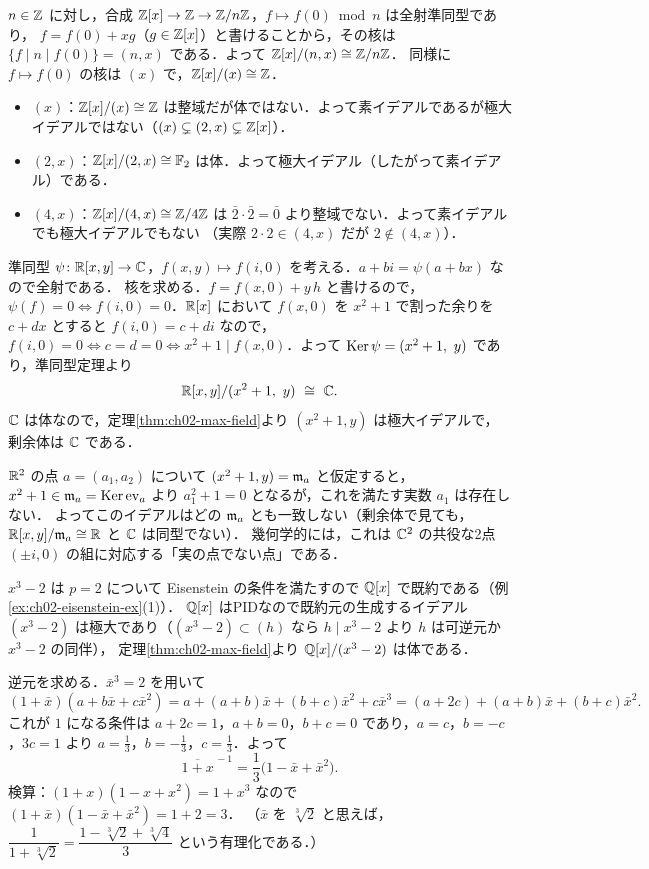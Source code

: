 $n\in\mathbb{Z}$ に対し，合成 $\mathbb{Z}[x]\to\mathbb{Z}\to\mathbb{Z}/n\mathbb{Z}$，$f\mapsto f(0)\bmod n$ は全射準同型であり，
$f=f(0)+xg$（$g\in\mathbb{Z}[x]$）と書けることから，その核は $\{f\mid n\mid f(0)\}=(n,x)$ である．よって $\mathbb{Z}[x]/(n,x)\cong\mathbb{Z}/n\mathbb{Z}$．
同様に $f\mapsto f(0)$ の核は $(x)$ で，$\mathbb{Z}[x]/(x)\cong\mathbb{Z}$．
\begin{itemize}
  \item $(x)$：$\mathbb{Z}[x]/(x)\cong\mathbb{Z}$ は整域だが体ではない．よって素イデアルであるが極大イデアルではない（$(x)\subsetneq(2,x)\subsetneq\mathbb{Z}[x]$）．
  \item $(2,x)$：$\mathbb{Z}[x]/(2,x)\cong\mathbb{F}_2$ は体．よって極大イデアル（したがって素イデアル）である．
  \item $(4,x)$：$\mathbb{Z}[x]/(4,x)\cong\mathbb{Z}/4\mathbb{Z}$ は $\bar2\cdot\bar2=\bar0$ より整域でない．よって素イデアルでも極大イデアルでもない
        （実際 $2\cdot2\in(4,x)$ だが $2\notin(4,x)$）．
\end{itemize}

準同型 $\psi\colon\mathbb{R}[x,y]\to\mathbb{C}$，$f(x,y)\mapsto f(i,0)$ を考える．$a+bi=\psi(a+bx)$ なので全射である．
核を求める．$f=f(x,0)+y\,h$ と書けるので，$\psi(f)=0\iff f(i,0)=0$．$\mathbb{R}[x]$ において $f(x,0)$ を $x^2+1$ で割った余りを $c+dx$ とすると
$f(i,0)=c+di$ なので，$f(i,0)=0\iff c=d=0\iff x^2+1\mid f(x,0)$．よって $\operatorname{Ker}\psi=(x^2+1,\ y)$ であり，準同型定理より
\[
  \R[x,y]/(x^2+1,\ y)\ \cong\ \C.
\]
$\mathbb{C}$ は体なので，定理\ref{thm:ch02-max-field}より $(x^2+1,y)$ は極大イデアルで，剰余体は $\mathbb{C}$ である．

$\mathbb{R}^2$ の点 $a=(a_1,a_2)$ について $(x^2+1,y)=\mathfrak{m}_a$ と仮定すると，$x^2+1\in\mathfrak{m}_a=\operatorname{Ker}\mathrm{ev}_a$ より $a_1^2+1=0$ となるが，これを満たす実数 $a_1$ は存在しない．
よってこのイデアルはどの $\mathfrak{m}_a$ とも一致しない（剰余体で見ても，$\mathbb{R}[x,y]/\mathfrak{m}_a\cong\mathbb{R}$ と $\mathbb{C}$ は同型でない）．
幾何学的には，これは $\mathbb{C}^2$ の共役な2点 $(\pm i,0)$ の組に対応する「実の点でない点」である．

$x^3-2$ は $p=2$ について Eisenstein の条件を満たすので $\mathbb{Q}[x]$ で既約である（例\ref{ex:ch02-eisenstein-ex}(1)）．
$\mathbb{Q}[x]$ はPIDなので既約元の生成するイデアル $(x^3-2)$ は極大であり（$(x^3-2)\subset(h)$ なら $h\mid x^3-2$ より $h$ は可逆元か $x^3-2$ の同伴），
定理\ref{thm:ch02-max-field}より $\mathbb{Q}[x]/(x^3-2)$ は体である．

逆元を求める．$\bar x^3=2$ を用いて
\[
  (1+\bar x)(a+b\bar x+c\bar x^2)=a+(a+b)\bar x+(b+c)\bar x^2+c\bar x^3=(a+2c)+(a+b)\bar x+(b+c)\bar x^2.
\]
これが $1$ になる条件は $a+2c=1$，$a+b=0$，$b+c=0$ であり，$a=c$，$b=-c$，$3c=1$ より $a=\frac13$，$b=-\frac13$，$c=\frac13$．よって
\[
  \overline{1+x}^{\,-1}=\frac13\bigl(1-\bar x+\bar x^2\bigr).
\]
検算：$(1+x)(1-x+x^2)=1+x^3$ なので $(1+\bar x)(1-\bar x+\bar x^2)=1+2=3$．
（$\bar x$ を $\sqrt[3]2$ と思えば，$\dfrac1{1+\sqrt[3]2}=\dfrac{1-\sqrt[3]2+\sqrt[3]4}{3}$ という有理化である．）

